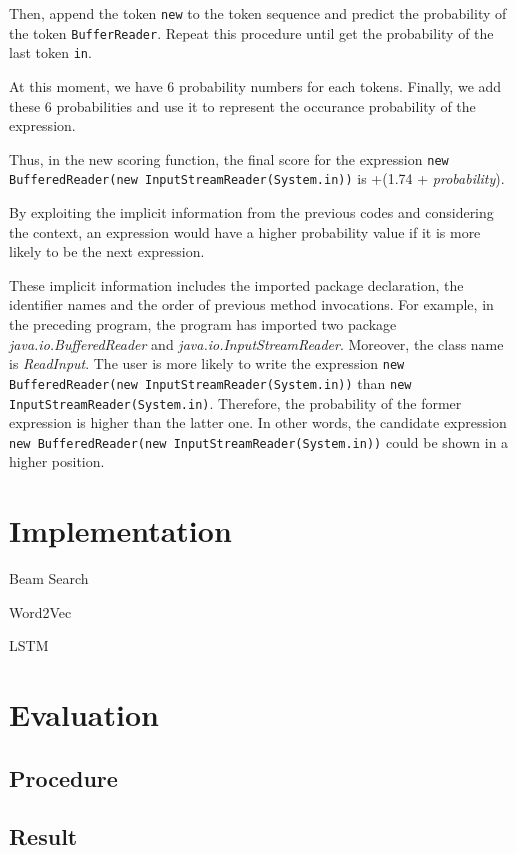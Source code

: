 \documentclass[PRO,english]{ipsj}
\begin{document}
Then, append the token \texttt{new} to the token sequence and predict the probability of the token \texttt{BufferReader}. Repeat this procedure until get the probability of the last token \texttt{in}. 

At this moment, we have 6 probability numbers for each tokens.  Finally, we add these 6 probabilities and use it to represent the occurance probability of the expression.

Thus, in the new scoring function, the final score for the expression \texttt{new BufferedReader(new InputStreamReader(System.in))} is +(1.74 + \textit{probability}).

By exploiting the implicit information from the previous codes and considering the context, an expression would have a higher probability value if it is more likely to be the next expression. 

These implicit information includes the imported package declaration, the identifier names and the order of previous method invocations. For example, in the preceding program, the program has imported two package \textit{java.io.BufferedReader} and \textit{java.io.InputStreamReader}. Moreover, the class name is \textit{ReadInput}. The user is more likely to write the expression \texttt{new BufferedReader(new InputStreamReader(System.in))} than \texttt{new InputStreamReader(System.in)}. Therefore, the probability of the former expression is higher than the latter one. In other words, the candidate expression \texttt{new BufferedReader(new InputStreamReader(System.in))} could be shown in a higher position.


\section{Implementation}

Beam Search

Word2Vec

LSTM

\section{Evaluation}
\subsection{Procedure}

\subsection{Result}
\end{document}
